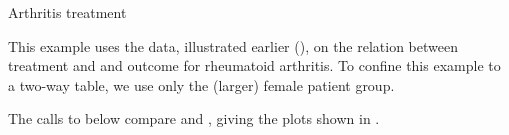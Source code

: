 \documentclass[11pt]{book}
\renewenvironment{knitrout}{\small\renewcommand{\baselinestretch}{.85}}{} %
\begin{document}
\begin{Example}{Arthritis treatment}

This example uses the  data, illustrated earlier (),
on the relation between treatment and and outcome for rheumatoid arthritis.
To confine this example to a two-way table, we use only the (larger) female
patient group.
\begin{knitrout}
\color{fgcolor}\begin{kframe}
\begin{alltt}
 \hlkwb{<-} \hlstd{(}\hlopt{~}  \hlopt{+}   
               \hlopt{==} \hlstd{)}
\hlstd{(}\hlstd{(art))[}\hlstd{]} \hlkwb{<-} 
\end{alltt}
\end{kframe}
\end{knitrout}
The calls to  below compare  and ,
giving the plots shown in .

\begin{knitrout}
\color{fgcolor}\begin{kframe}
\begin{alltt}
   \hlstd{=} \hlstd{(} \hlstd{=} \hlstd{),}
        \hlstd{=}\hlstd{,} \hlstd{=}\hlstd{)}
\hlstd{(}\hlstd{)}
   \hlstd{=} \hlstd{(} \hlstd{=} \hlstd{))}
\end{alltt}
\end{kframe}\begin{figure}[!htbp]



\end{figure}
\end{knitrout}
\end{Example}
\end{document}
